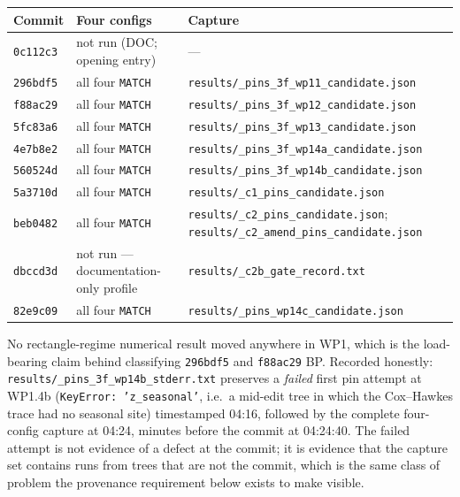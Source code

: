 \documentclass[
  10pt,
]{article}
\begin{document}
\begin{longtable}[]{@{}
  >{\raggedright\arraybackslash}p{}
  >{\raggedright\arraybackslash}p{}
  >{\raggedright\arraybackslash}p{}@{}}
\toprule\noalign{}
Commit & Four configs & Capture \\
\midrule\noalign{}
\endhead
\bottomrule\noalign{}
\endlastfoot
\texttt{0c112c3} & not run (DOC; opening entry) & --- \\
\texttt{296bdf5} & all four \texttt{MATCH} & \texttt{results/\allowbreak{}\_pins\_3f\_wp11\_candidate.json} \\
\texttt{f88ac29} & all four \texttt{MATCH} & \texttt{results/\allowbreak{}\_pins\_3f\_wp12\_candidate.json} \\
\texttt{5fc83a6} & all four \texttt{MATCH} & \texttt{results/\allowbreak{}\_pins\_3f\_wp13\_candidate.json} \\
\texttt{4e7b8e2} & all four \texttt{MATCH} & \texttt{results/\allowbreak{}\_pins\_3f\_wp14a\_candidate.json} \\
\texttt{560524d} & all four \texttt{MATCH} & \texttt{results/\allowbreak{}\_pins\_3f\_wp14b\_candidate.json} \\
\texttt{5a3710d} & all four \texttt{MATCH} & \texttt{results/\allowbreak{}\_c1\_pins\_candidate.json} \\
\texttt{beb0482} & all four \texttt{MATCH} & \texttt{results/\allowbreak{}\_c2\_pins\_candidate.json}; \texttt{results/\allowbreak{}\_c2\_amend\_pins\_candidate.json} \\
\texttt{dbccd3d} & not run --- documentation-only profile & \texttt{results/\allowbreak{}\_c2b\_gate\_record.txt} \\
\texttt{82e9c09} & all four \texttt{MATCH} & \texttt{results/\allowbreak{}\_pins\_wp14c\_candidate.json} \\
\end{longtable}

\noindent No rectangle-regime numerical result moved anywhere in WP1, which is the load-bearing claim behind classifying \texttt{296bdf5} and \texttt{f88ac29} BP. Recorded honestly: \texttt{results/\allowbreak{}\_pins\_3f\_wp14b\_stderr.txt} preserves a \emph{failed} first pin attempt at WP1.4b (\texttt{KeyError: 'z\_seasonal'}, i.e.\ a mid-edit tree in which the Cox--Hawkes trace had no seasonal site) timestamped 04:16, followed by the complete four-config capture at 04:24, minutes before the commit at 04:24:40. The failed attempt is not evidence of a defect at the commit; it is evidence that the capture set contains runs from trees that are not the commit, which is the same class of problem the provenance requirement below exists to make visible.
\end{document}
